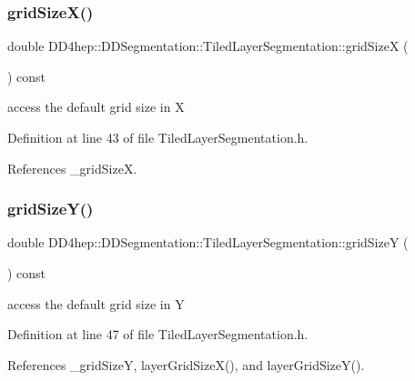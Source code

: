 \subsubsection{\texorpdfstring{grid\+Size\+X()}{gridSizeX()}}
{\footnotesize\ttfamily double D\+D4hep\+::\+D\+D\+Segmentation\+::\+Tiled\+Layer\+Segmentation\+::grid\+SizeX (\begin{DoxyParamCaption}{ }\end{DoxyParamCaption}) const\hspace{0.3cm}{\ttfamily [inline]}}



access the default grid size in X 



Definition at line 43 of file Tiled\+Layer\+Segmentation.\+h.



References \+\_\+grid\+SizeX.

\hypertarget{class_d_d4hep_1_1_d_d_segmentation_1_1_tiled_layer_segmentation_aac9ed479ad94dbe1b8dc1328f3c3f894}{}\label{class_d_d4hep_1_1_d_d_segmentation_1_1_tiled_layer_segmentation_aac9ed479ad94dbe1b8dc1328f3c3f894} 
\subsubsection{\texorpdfstring{grid\+Size\+Y()}{gridSizeY()}}
{\footnotesize\ttfamily double D\+D4hep\+::\+D\+D\+Segmentation\+::\+Tiled\+Layer\+Segmentation\+::grid\+SizeY (\begin{DoxyParamCaption}{ }\end{DoxyParamCaption}) const\hspace{0.3cm}{\ttfamily [inline]}}



access the default grid size in Y 



Definition at line 47 of file Tiled\+Layer\+Segmentation.\+h.



References \+\_\+grid\+SizeY, layer\+Grid\+Size\+X(), and layer\+Grid\+Size\+Y().

\hypertarget{class_d_d4hep_1_1_d_d_segmentation_1_1_tiled_layer_segmentation_a3255d9d66a2d205dab49072c079dfaf1}{}\label{class_d_d4hep_1_1_d_d_segmentation_1_1_tiled_layer_segmentation_a3255d9d66a2d205dab49072c079dfaf1} 
